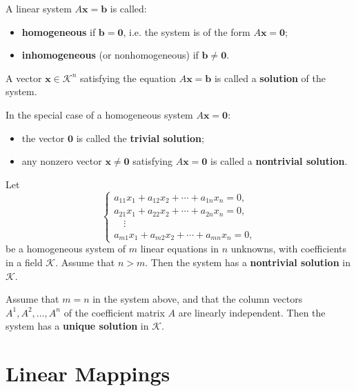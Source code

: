 \documentclass{ctexart}
\begin{document}
	
	\begin{mydef}
		A linear system $A\mathbf{x} = \mathbf{b}$ is called:
		\begin{itemize}
			\item \textbf{homogeneous} if $\mathbf{b} = \mathbf{0}$, i.e. the system is of the form $A\mathbf{x} = \mathbf{0}$;
			\item \textbf{inhomogeneous} (or nonhomogeneous) if $\mathbf{b} \neq \mathbf{0}$.
		\end{itemize}
	\end{mydef}
	
	\begin{mydef}
		A vector $\mathbf{x} \in \mathcal{K}^n$ satisfying the equation $A\mathbf{x} = \mathbf{b}$ is called a \textbf{solution} of the system.
		
		In the special case of a homogeneous system $A\mathbf{x} = \mathbf{0}$:
		\begin{itemize}
			\item the vector $\mathbf{0}$ is called the \textbf{trivial solution};
			\item any nonzero vector $\mathbf{x} \neq \mathbf{0}$ satisfying $A\mathbf{x} = \mathbf{0}$ is called a \textbf{nontrivial solution}.
		\end{itemize}
	\end{mydef}
	
	\begin{mythm}
		Let
		\[
		\begin{cases}
			a_{11}x_1 + a_{12}x_2 + \cdots + a_{1n}x_n = 0,\\
			a_{21}x_1 + a_{22}x_2 + \cdots + a_{2n}x_n = 0,\\
			\quad \vdots \\
			a_{m1}x_1 + a_{m2}x_2 + \cdots + a_{mn}x_n = 0,
		\end{cases}
		\]
		be a homogeneous system of $m$ linear equations in $n$ unknowns, with coefficients in a field $\mathcal{K}$.  
		Assume that $n > m$.  
		Then the system has a \textbf{nontrivial solution} in $\mathcal{K}$.
	\end{mythm}
	
	\begin{mythm}
		Assume that $m = n$ in the system above, and that the column vectors 
		$A^1, A^2, \dots, A^n$ of the coefficient matrix $A$ are linearly independent.  
		Then the system has a \textbf{unique solution} in $\mathcal{K}$.
	\end{mythm}
	
	\newpage
	\section{Linear Mappings}
	
\end{document}
